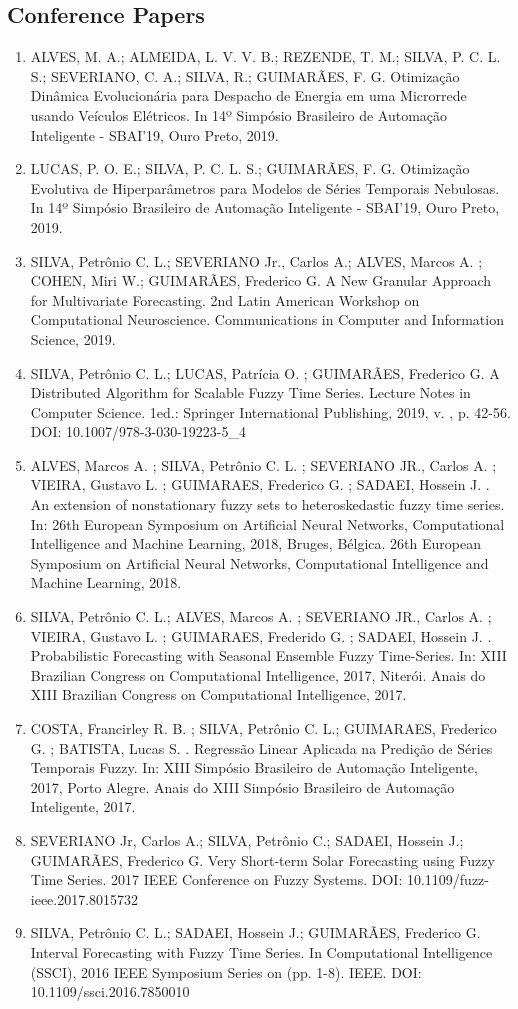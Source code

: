 \subsection{Conference Papers}
\begin{enumerate}
\item  ALVES, M. A.; ALMEIDA, L. V. V. B.; REZENDE, T. M.; SILVA, P. C. L. S.; SEVERIANO, C. A.; SILVA, R.; GUIMARÃES, F. G. Otimização Dinâmica Evolucionária para Despacho de Energia em uma Microrrede usando Veículos Elétricos. In 14º Simpósio Brasileiro de Automação Inteligente - SBAI'19, Ouro Preto, 2019.
\item  LUCAS, P. O. E.; SILVA, P. C. L. S.; GUIMARÃES, F. G. Otimização Evolutiva de Hiperparâmetros para Modelos de Séries Temporais Nebulosas.  In 14º Simpósio Brasileiro de Automação Inteligente - SBAI'19, Ouro Preto, 2019.
\item SILVA, Petrônio C. L.; SEVERIANO Jr., Carlos A.; ALVES, Marcos A. ; COHEN, Miri W.; GUIMARÃES, Frederico G. A New Granular Approach for Multivariate Forecasting. 2nd Latin American Workshop on Computational Neuroscience. Communications in Computer and Information Science, 2019.
\item SILVA, Petrônio C. L.; LUCAS, Patrícia O. ; GUIMARÃES, Frederico G. A Distributed Algorithm for Scalable Fuzzy Time Series. Lecture Notes in Computer Science. 1ed.: Springer International Publishing, 2019, v. , p. 42-56. DOI: 10.1007/978-3-030-19223-5\_4
\item ALVES, Marcos A. ; SILVA, Petrônio C. L. ; SEVERIANO JR., Carlos A. ; VIEIRA, Gustavo L. ; GUIMARAES, Frederico G. ; SADAEI, Hossein J. . An extension of nonstationary fuzzy sets to heteroskedastic fuzzy time series. In: 26th European Symposium on Artificial Neural Networks, Computational Intelligence and Machine Learning, 2018, Bruges, Bélgica. 26th European Symposium on Artificial Neural Networks, Computational Intelligence and Machine Learning, 2018.
\item SILVA, Petrônio C. L.; ALVES, Marcos A. ; SEVERIANO JR., Carlos A. ; VIEIRA, Gustavo L. ; GUIMARAES, Frederido G. ; SADAEI, Hossein J. . Probabilistic Forecasting with Seasonal Ensemble Fuzzy Time-Series. In: XIII Brazilian Congress on Computational Intelligence, 2017, Niterói. Anais do XIII Brazilian Congress on Computational Intelligence, 2017.
\item COSTA, Francirley R. B. ; SILVA, Petrônio C. L.; GUIMARAES, Frederico G. ; BATISTA, Lucas S. . Regressão Linear Aplicada na Predição de Séries Temporais Fuzzy. In: XIII Simpósio Brasileiro de Automação Inteligente, 2017, Porto Alegre. Anais do XIII Simpósio Brasileiro de Automação Inteligente, 2017. 
\item SEVERIANO Jr, Carlos A.; SILVA, Petrônio C.; SADAEI, Hossein J.; GUIMARÃES, Frederico G. Very Short-term Solar Forecasting using Fuzzy Time Series. 2017 IEEE Conference on Fuzzy Systems. DOI: 10.1109/fuzz-ieee.2017.8015732
\item SILVA, Petrônio C. L.; SADAEI, Hossein J.; GUIMARÃES, Frederico G. Interval Forecasting with Fuzzy Time Series. In Computational Intelligence (SSCI), 2016 IEEE Symposium Series on (pp. 1-8). IEEE. DOI: 10.1109/ssci.2016.7850010
\end{enumerate}

